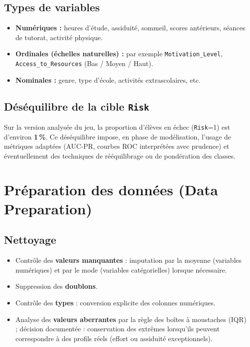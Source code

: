 \documentclass[a4paper,11pt]{article}
\begin{document}
\subsection{Types de variables}
\begin{itemize}[leftmargin=*]
  \item \textbf{Numériques :} heures d'étude, assiduité, sommeil, scores antérieurs, séances de tutorat, activité physique.
  \item \textbf{Ordinales (échelles naturelles) :} par exemple \texttt{Motivation\_Level}, \texttt{Access\_to\_Resources} (Bas / Moyen / Haut).
  \item \textbf{Nominales :} genre, type d'école, activités extrascolaires, etc.
\end{itemize}

\subsection{Déséquilibre de la cible \texttt{Risk}}
Sur la version analysée du jeu, la proportion d'élèves en échec (\texttt{Risk}=1) est d'environ \textbf{1\,\%}. Ce déséquilibre impose, en phase de modélisation, l'usage de métriques adaptées (AUC-PR, courbes ROC interprétées avec prudence) et éventuellement des techniques de rééquilibrage ou de pondération des classes.

\section{Préparation des données (Data Preparation)}

\subsection{Nettoyage}
\begin{itemize}[leftmargin=*]
  \item Contrôle des \textbf{valeurs manquantes} : imputation par la moyenne (variables numériques) et par le mode (variables catégorielles) lorsque nécessaire.
  \item Suppression des \textbf{doublons}.
  \item Contrôle des \textbf{types} : conversion explicite des colonnes numériques.
  \item Analyse des \textbf{valeurs aberrantes} par la règle des boîtes à moustaches (IQR) ; décision documentée : conservation des extrêmes lorsqu'ils peuvent correspondre à des profils réels (effort ou assiduité exceptionnels).
\end{itemize}
\end{document}
